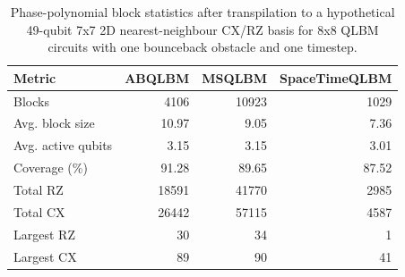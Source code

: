 \begin{table}[ht]
\centering
\begin{tabular}{lrrr}
\hline
Metric & ABQLBM & MSQLBM & SpaceTimeQLBM \\
\hline
Blocks & 4106 & 10923 & 1029 \\
Avg. block size & 10.97 & 9.05 & 7.36 \\
Avg. active qubits & 3.15 & 3.15 & 3.01 \\
Coverage (\%) & 91.28 & 89.65 & 87.52 \\
Total RZ & 18591 & 41770 & 2985 \\
Total CX & 26442 & 57115 & 4587 \\
Largest RZ & 30 & 34 & 1 \\
Largest CX & 89 & 90 & 41 \\
\hline
\end{tabular}
\caption{Phase-polynomial block statistics after transpilation to a hypothetical 49-qubit 7x7 2D nearest-neighbour CX/RZ basis for 8x8 QLBM circuits with one bounceback obstacle and one timestep.}
\label{tab:phase-poly-block-statistics-2d-grid}
\end{table}

